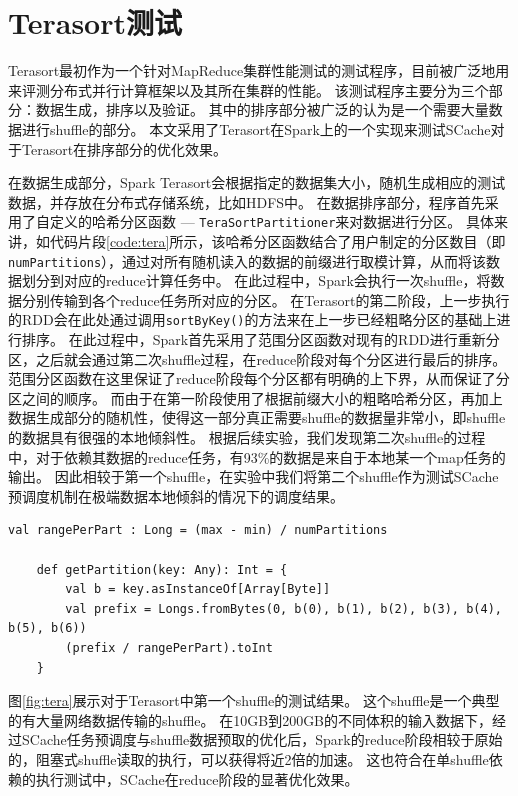 \section{Terasort测试}

Terasort最初作为一个针对MapReduce集群性能测试的测试程序，目前被广泛地用来评测分布式并行计算框架以及其所在集群的性能。
该测试程序主要分为三个部分：数据生成，排序以及验证。
其中的排序部分被广泛的认为是一个需要大量数据进行shuffle的部分。
本文采用了Terasort在Spark上的一个实现\cite{terasort}来测试SCache对于Terasort在排序部分的优化效果。

在数据生成部分，Spark Terasort会根据指定的数据集大小，随机生成相应的测试数据，并存放在分布式存储系统，比如HDFS中。
在数据排序部分，程序首先采用了自定义的哈希分区函数 --- \verb|TeraSortPartitioner|来对数据进行分区。
具体来讲，如代码片段\ref{code:tera}所示，该哈希分区函数结合了用户制定的分区数目（即\verb|numPartitions|），通过对所有随机读入的数据的前缀进行取模计算，从而将该数据划分到对应的reduce计算任务中。
在此过程中，Spark会执行一次shuffle，将数据分别传输到各个reduce任务所对应的分区。
在Terasort的第二阶段，上一步执行的RDD会在此处通过调用\verb|sortByKey()|的方法来在上一步已经粗略分区的基础上进行排序。
在此过程中，Spark首先采用了范围分区函数对现有的RDD进行重新分区，之后就会通过第二次shuffle过程，在reduce阶段对每个分区进行最后的排序。
范围分区函数在这里保证了reduce阶段每个分区都有明确的上下界，从而保证了分区之间的顺序。
而由于在第一阶段使用了根据前缀大小的粗略哈希分区，再加上数据生成部分的随机性，使得这一部分真正需要shuffle的数据量非常小，即shuffle的数据具有很强的本地倾斜性。
根据后续实验，我们发现第二次shuffle的过程中，对于依赖其数据的reduce任务，有93\%的数据是来自于本地某一个map任务的输出。
因此相较于第一个shuffle，在实验中我们将第二个shuffle作为测试SCache预调度机制在极端数据本地倾斜的情况下的调度结果。

\begin{lstlisting}[style={myScalastyle}, caption={Terasort哈希分区函数代码(Scala)}, label={code:tera}]
    val rangePerPart : Long = (max - min) / numPartitions

    def getPartition(key: Any): Int = {
        val b = key.asInstanceOf[Array[Byte]]
        val prefix = Longs.fromBytes(0, b(0), b(1), b(2), b(3), b(4), b(5), b(6))
        (prefix / rangePerPart).toInt
    }
\end{lstlisting}

图\ref{fig:tera}展示对于Terasort中第一个shuffle的测试结果。
这个shuffle是一个典型的有大量网络数据传输的shuffle。
在10GB到200GB的不同体积的输入数据下，经过SCache任务预调度与shuffle数据预取的优化后，Spark的reduce阶段相较于原始的，阻塞式shuffle读取的执行，可以获得将近2倍的加速。
这也符合在单shuffle依赖的执行测试中，SCache在reduce阶段的显著优化效果。

